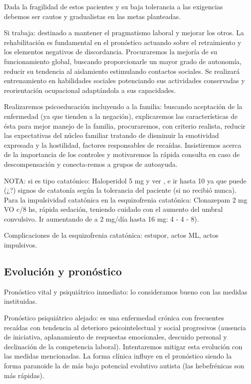 Dada la fragilidad de estos pacientes y su baja tolerancia a las exigencias debemos ser cautos y gradualistas en las metas planteadas.

Si trabaja: destinado a mantener el pragmatismo laboral y mejorar los otros. La rehabilitación es fundamental en el pronóstico actuando sobre el retraimiento y los elementos negativos de discordancia. Procuraremos la mejoría de su funcionamiento global, buscando proporcionarle un mayor grado de autonomía, reducir su tendencia al aislamiento estimulando contactos sociales. Se realizará entrenamiento en habilidades sociales potenciando sus actividades conservadas y reorientación ocupacional adaptándola a sus capacidades.

Realizaremos psicoeducación incluyendo a la familia: buscando aceptación de la enfermedad (ya que tienden a la negación), explicaremos las características de ésta para mejor manejo de la familia, procuraremos, con criterio realista, reducir las expectativas del núcleo familiar tratando de disminuir la emotividad expresada y la hostilidad, factores responsables de recaídas. Insistiremos acerca de la importancia de los controles y motivaremos la rápida consulta en caso de descompensación y conecta-remos a grupos de autoayuda.

NOTA: si es tipo catatónico: Haloperidol 5 mg y ver , e ir hasta 10 ya que puede (¿?) signos de catatonía según la tolerancia del paciente (si no recibió nunca). Para la impulsividad catatónica en la esquizofrenia catatónica: Clonazepam 2 mg VO c/8 hs, rápida sedación, teniendo cuidado con el aumento del umbral convulsivo. Ir aumentando de a 2 mg/día hasta 16 mg: 4 - 4 - 8).

Complicaciones de la esquizofrenia catatónica: estupor, actos ML, actos impulsivos.
\subsection*{Evolución y pronóstico}
Pronóstico vital y psiquiátrico inmediato: lo consideramos bueno con las medidas instituidas.

Pronóstico psiquiátrico alejado: es una enfermedad crónica con frecuentes recaídas con tendencia al deterioro psicointelectual y social progresivos (ausencia de iniciativa, aplanamiento de respuestas emocionales, descuido personal y declinación de la competencia laboral). Intentaremos mitigar esta evolución con las medidas mencionadas. La forma clínica influye en el pronóstico siendo la forma paranoide la de más bajo potencial evolutivo autista (las hebefrénicas son más rápidas).

